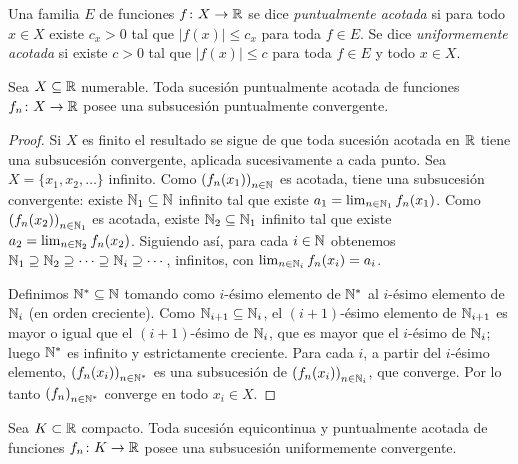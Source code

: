 \begin{definition}
  Una familia \(E\) de funciones \(f\colon X \to \mathbb{R}\) se dice \emph{puntualmente acotada} si para todo \(x \in X\) existe \(c_x > 0\) tal que \(|f(x)| \leq c_x\) para toda \(f \in E\). Se dice \emph{uniformemente acotada} si existe \(c > 0\) tal que \(|f(x)| \leq c\) para toda \(f \in E\) y todo \(x \in X\).
\end{definition}

\begin{theorem}
  Sea \(X \subseteq \mathbb{R}\) numerable. Toda sucesión puntualmente acotada de funciones \(f_n\colon X \to \mathbb{R}\) posee una subsucesión puntualmente convergente.
\end{theorem}

\begin{proof}
  Si \(X\) es finito el resultado se sigue de que toda sucesión acotada en \(\mathbb{R}\) tiene una subsucesión convergente, aplicada sucesivamente a cada punto. Sea \(X = \{x_1, x_2, \dots\}\) infinito. Como \({(f_n(x_1))}_{n \in \mathbb{N}}\) es acotada, tiene una subsucesión convergente: existe \(\mathbb{N}_1 \subseteq \mathbb{N}\) infinito tal que existe \(a_1 = \lim_{n \in \mathbb{N}_1} f_n(x_1)\). Como \({(f_n(x_2))}_{n \in \mathbb{N}_1}\) es acotada, existe \(\mathbb{N}_2 \subseteq \mathbb{N}_1\) infinito tal que existe \(a_2 = \lim_{n \in \mathbb{N}_2} f_n(x_2)\). Siguiendo así, para cada \(i \in \mathbb{N}\) obtenemos \(\mathbb{N}_1 \supseteq \mathbb{N}_2 \supseteq \cdots \supseteq \mathbb{N}_i \supseteq \cdots\), infinitos, con \(\lim_{n \in \mathbb{N}_i} f_n(x_i) = a_i\).

  Definimos \(\mathbb{N}^* \subseteq \mathbb{N}\) tomando como \(i\)-ésimo elemento de \(\mathbb{N}^*\) al \(i\)-ésimo elemento de \(\mathbb{N}_i\) (en orden creciente). Como \(\mathbb{N}_{i+1} \subseteq \mathbb{N}_i\), el \((i+1)\)-ésimo elemento de \(\mathbb{N}_{i+1}\) es mayor o igual que el \((i+1)\)-ésimo de \(\mathbb{N}_i\), que es mayor que el \(i\)-ésimo de \(\mathbb{N}_i\); luego \(\mathbb{N}^*\) es infinito y estrictamente creciente. Para cada \(i\), a partir del \(i\)-ésimo elemento, \({(f_n(x_i))}_{n \in \mathbb{N}^*}\) es una subsucesión de \({(f_n(x_i))}_{n \in \mathbb{N}_i}\), que converge. Por lo tanto \({(f_n)}_{n \in \mathbb{N}^*}\) converge en todo \(x_i \in X\).
\end{proof}

\begin{theorem}
  Sea \(K \subset \mathbb{R}\) compacto. Toda sucesión equicontinua y puntualmente acotada de funciones \(f_n\colon K \to \mathbb{R}\) posee una subsucesión uniformemente convergente.
\end{theorem}


